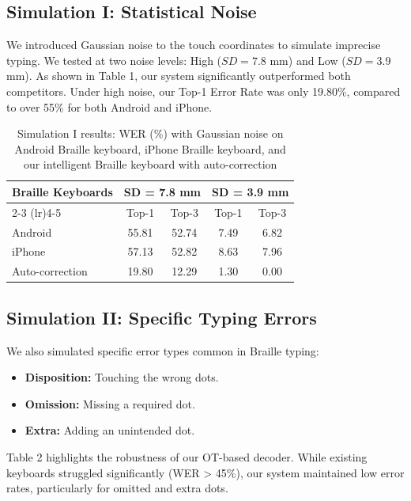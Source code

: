 \documentclass[manuscript,review]{acmart}
\begin{document}
\subsection{Simulation I: Statistical Noise}
We introduced Gaussian noise to the touch coordinates to simulate imprecise typing. We tested at two noise levels: High ($SD=7.8$ mm) and Low ($SD=3.9$ mm). As shown in Table 1, our system significantly outperformed both competitors. Under high noise, our Top-1 Error Rate was only 19.80\%, compared to over 55\% for both Android and iPhone.

\begin{table}[h]
  \caption{Simulation I results: WER (\%) with Gaussian noise on Android Braille keyboard, iPhone Braille keyboard, and our intelligent Braille keyboard with auto-correction}
  \label{tab:sim1}
  \begin{tabular}{lcccc}
    \toprule
    Braille Keyboards & \multicolumn{2}{c}{SD = 7.8 mm} & \multicolumn{2}{c}{SD = 3.9 mm} \\
    \cmidrule(lr){2-3} \cmidrule(lr){4-5}
    & Top-1 & Top-3 & Top-1 & Top-3 \\
    \midrule
    Android & 55.81 & 52.74 & 7.49 & 6.82 \\
    iPhone & 57.13 & 52.82 & 8.63 & 7.96 \\
    Auto-correction & 19.80 & 12.29 & 1.30 & 0.00 \\
    \bottomrule
  \end{tabular}
\end{table}

\subsection{Simulation II: Specific Typing Errors}
We also simulated specific error types common in Braille typing:
\begin{itemize}
    \item \textbf{Disposition:} Touching the wrong dots.
    \item \textbf{Omission:} Missing a required dot.
    \item \textbf{Extra:} Adding an unintended dot.
\end{itemize}

Table 2 highlights the robustness of our OT-based decoder. While existing keyboards struggled significantly (WER > 45\%), our system maintained low error rates, particularly for omitted and extra dots.
\end{document}
